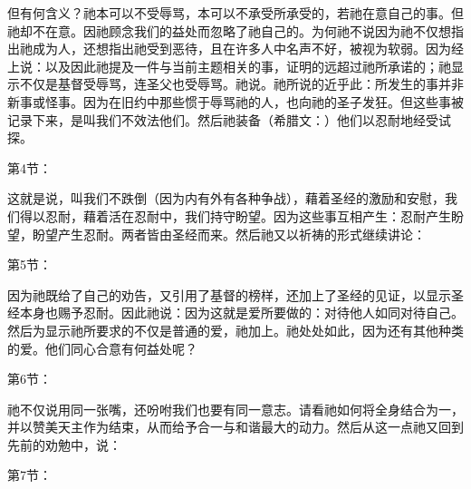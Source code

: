 但有何含义？祂本可以不受辱骂，本可以不承受所承受的，若祂在意自己的事。但祂却不在意。因祂顾念我们的益处而忽略了祂自己的。为何祂不说因为祂不仅想指出祂成为人，还想指出祂受到恶待，且在许多人中名声不好，被视为软弱。因为经上说：以及因此祂提及一件与当前主题相关的事，证明的远超过祂所承诺的；祂显示不仅是基督受辱骂，连圣父也受辱骂。祂说。祂所说的近乎此：所发生的事并非新事或怪事。因为在旧约中那些惯于辱骂祂的人，也向祂的圣子发狂。但这些事被记录下来，是叫我们不效法他们。然后祂装备（希腊文：）他们以忍耐地经受试探。\par

第4节：\par

这就是说，叫我们不跌倒（因为内有外有各种争战），藉着圣经的激励和安慰，我们得以忍耐，藉着活在忍耐中，我们持守盼望。因为这些事互相产生：忍耐产生盼望，盼望产生忍耐。两者皆由圣经而来。然后祂又以祈祷的形式继续讲论：\par

第5节：\par

因为祂既给了自己的劝告，又引用了基督的榜样，还加上了圣经的见证，以显示圣经本身也赐予忍耐。因此祂说：因为这就是爱所要做的：对待他人如同对待自己。然后为显示祂所要求的不仅是普通的爱，祂加上。祂处处如此，因为还有其他种类的爱。他们同心合意有何益处呢？\par

第6节：\par

祂不仅说用同一张嘴，还吩咐我们也要有同一意志。请看祂如何将全身结合为一，并以赞美天主作为结束，从而给予合一与和谐最大的动力。然后从这一点祂又回到先前的劝勉中，说：\par

第7节：\par

